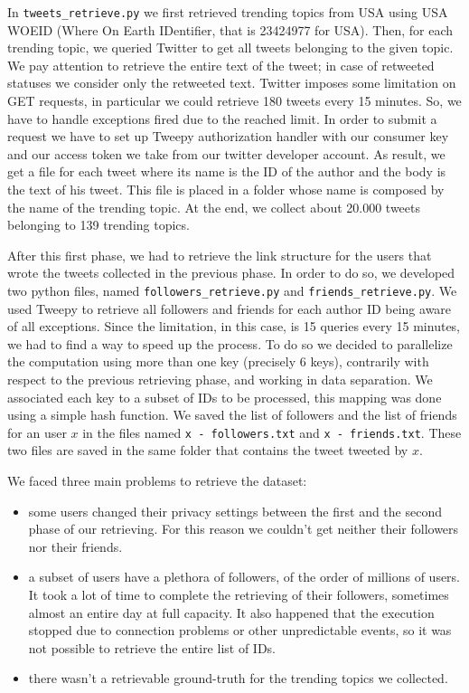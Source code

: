 \documentclass[journal,11pt]{vgtc}
\begin{document}
In \texttt{tweets\_retrieve.py} we
first retrieved trending topics from USA using USA WOEID (Where On Earth IDentifier, that is 23424977 for USA).
Then, for each trending topic, we queried Twitter to get all tweets belonging to the given topic.
We pay attention to retrieve the entire text of the tweet; in case of retweeted statuses we consider only the
retweeted text.
Twitter imposes some limitation on GET requests, in particular we could retrieve 180 tweets every 15 minutes.
So, we have to handle exceptions fired due to the reached limit.
In order to submit a request we have to set up Tweepy authorization handler with our
consumer key and our access token we take from our twitter developer account.
As result, we get a file for each tweet where its name is the ID of the author and the body is the text of his tweet.
This file is placed in a folder whose name is composed by the name of the trending topic.
At the end, we collect about 20.000 tweets belonging to 139 trending topics.

After this first phase, we had to retrieve the link structure for the users that wrote the tweets collected
in the previous phase. In order to do so, we developed two python files, named \texttt{followers\_retrieve.py} and
\texttt{friends\_retrieve.py}.
We used Tweepy to retrieve all followers and friends for each author ID being aware of all exceptions.
Since the limitation, in this case, is 15 queries every 15 minutes, we had to find a way to speed up the process.
To do so we decided to parallelize the computation using more than one key (precisely 6 keys), contrarily with respect to the previous
retrieving phase, and working in data separation. We associated each key to a subset of IDs to be processed, this
mapping was done using a simple hash function.
We saved the list of followers and the list of friends for an user $x$ in the files named \texttt{x - followers.txt}
and \texttt{x - friends.txt}. These two files are saved in the same folder that contains the tweet tweeted by $x$.

We faced three main problems to retrieve the dataset:
\begin{itemize}
  \item some users changed their privacy settings between the first and the second phase
  of our retrieving. For this reason we couldn't get neither their followers nor their friends.
  \item a subset of users have a plethora of followers, of the order of millions of users.
  It took a lot of time to complete the retrieving of their followers, sometimes almost an
  entire day at full capacity.
  It also happened that the execution stopped due to connection problems or other unpredictable events,
  so it was not possible to retrieve the entire list of IDs.
  \item there wasn't a retrievable ground-truth for the trending topics we collected.
\end{itemize}
\end{document}
